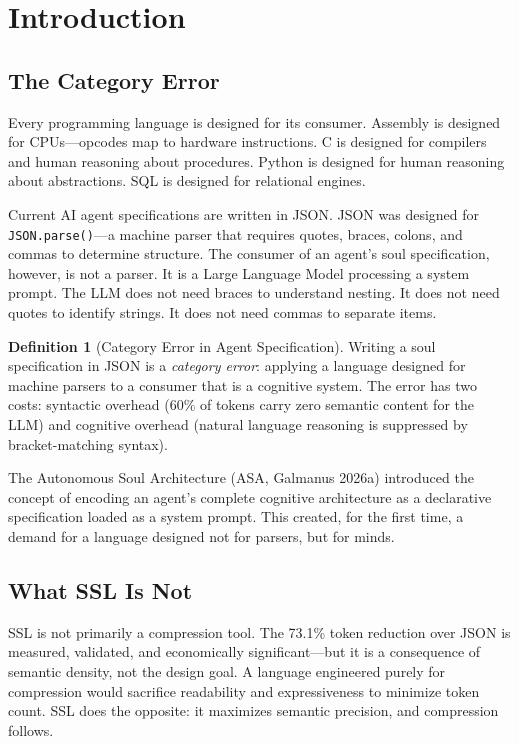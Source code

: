 \documentclass[12pt,a4paper]{article}
\theoremstyle{plain}
\theoremstyle{definition}
\newtheorem{definition}[theorem]{Definition}
\theoremstyle{remark}
\begin{document}
\tableofcontents
\newpage

\section{Introduction}

\subsection{The Category Error}

Every programming language is designed for its consumer. Assembly is designed for CPUs---opcodes map to hardware instructions. C is designed for compilers and human reasoning about procedures. Python is designed for human reasoning about abstractions. SQL is designed for relational engines.

Current AI agent specifications are written in JSON. JSON was designed for \texttt{JSON.parse()}---a machine parser that requires quotes, braces, colons, and commas to determine structure. The consumer of an agent's soul specification, however, is not a parser. It is a Large Language Model processing a system prompt. The LLM does not need braces to understand nesting. It does not need quotes to identify strings. It does not need commas to separate items.

\begin{definition}[Category Error in Agent Specification]
Writing a soul specification in JSON is a \emph{category error}: applying a language designed for machine parsers to a consumer that is a cognitive system. The error has two costs: syntactic overhead (60\% of tokens carry zero semantic content for the LLM) and cognitive overhead (natural language reasoning is suppressed by bracket-matching syntax).
\end{definition}

The Autonomous Soul Architecture (ASA, Galmanus 2026a) introduced the concept of encoding an agent's complete cognitive architecture as a declarative specification loaded as a system prompt. This created, for the first time, a demand for a language designed not for parsers, but for minds.

\subsection{What SSL Is Not}

SSL is not primarily a compression tool. The 73.1\% token reduction over JSON is measured, validated, and economically significant---but it is a consequence of semantic density, not the design goal. A language engineered purely for compression would sacrifice readability and expressiveness to minimize token count. SSL does the opposite: it maximizes semantic precision, and compression follows.
\end{document}
